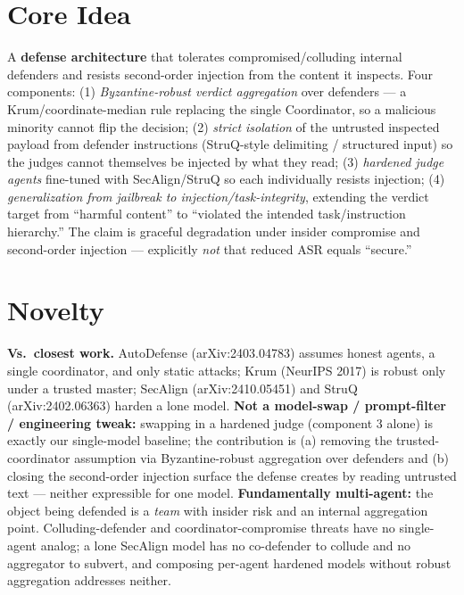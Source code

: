 \documentclass[11pt]{article}
\begin{document}
\section*{Core Idea}
A \textbf{defense architecture} that tolerates compromised/colluding internal defenders and resists second-order injection from the content it inspects. Four components: (1) \emph{Byzantine-robust verdict aggregation} over defenders --- a Krum/coordinate-median rule replacing the single Coordinator, so a malicious minority cannot flip the decision; (2) \emph{strict isolation} of the untrusted inspected payload from defender instructions (StruQ-style delimiting / structured input) so the judges cannot themselves be injected by what they read; (3) \emph{hardened judge agents} fine-tuned with SecAlign/StruQ so each individually resists injection; (4) \emph{generalization from jailbreak to injection/task-integrity}, extending the verdict target from ``harmful content'' to ``violated the intended task/instruction hierarchy.'' The claim is graceful degradation under insider compromise and second-order injection --- explicitly \emph{not} that reduced ASR equals ``secure.''

\section*{Novelty}
\textbf{Vs.\ closest work.} AutoDefense (arXiv:2403.04783) assumes honest agents, a single coordinator, and only static attacks; Krum (NeurIPS 2017) is robust only under a trusted master; SecAlign (arXiv:2410.05451) and StruQ (arXiv:2402.06363) harden a lone model. \textbf{Not a model-swap / prompt-filter / engineering tweak:} swapping in a hardened judge (component 3 alone) is exactly our single-model baseline; the contribution is (a) removing the trusted-coordinator assumption via Byzantine-robust aggregation over defenders and (b) closing the second-order injection surface the defense creates by reading untrusted text --- neither expressible for one model. \textbf{Fundamentally multi-agent:} the object being defended is a \emph{team} with insider risk and an internal aggregation point. Colluding-defender and coordinator-compromise threats have no single-agent analog; a lone SecAlign model has no co-defender to collude and no aggregator to subvert, and composing per-agent hardened models without robust aggregation addresses neither.
\end{document}
